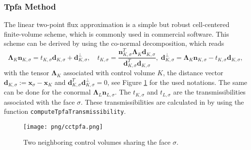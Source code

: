 \subsubsection{Tpfa Method}\label{cc_tpfa}
The linear two-point flux approximation is a simple but robust cell-centered finite-volume scheme, which is commonly used in commercial software.
This scheme can be derived by using the co-normal decomposition, which reads
\begin{equation}
\mathbf{\Lambda}_K \mathbf{n}_{K, \sigma} = t_{K,\sigma} \mathbf{d}_{K,\sigma} + \mathbf{d}^{\bot}_{K,\sigma}, \quad  t_{K,\sigma} = \frac{\mathbf{n}_{K, \sigma}^T \mathbf{\Lambda}_K \mathbf{d}_{K,\sigma} }{\mathbf{d}_{K,\sigma}^T \mathbf{d}_{K,\sigma}}, \; \mathbf{d}^{\bot}_{K,\sigma} = \mathbf{\Lambda}_K \mathbf{n}_{K, \sigma} - t_{K,\sigma} \mathbf{d}_{K,\sigma},
\label{eq:conormalDecTpfa}
\end{equation}
with the tensor $\mathbf{\Lambda}_K$ associated with control volume $K$, the distance vector $\mathbf{d}_{K,\sigma} := \mathbf{x}_\sigma - \mathbf{x}_K$ and $\mathbf{d}_{K,\sigma}^T \mathbf{d}^{\bot}_{K,\sigma} = 0$, see Figure \ref{pc:cctpfa} for the used notations. The same can be done for the conormal $\mathbf{\Lambda}_L \mathbf{n}_{L, \sigma}$. The $t_{K,\sigma}$ and $t_{L,\sigma}$ are the transmissibilities associated with the face $\sigma$. These transmissibilities are calculated in \Dumux by using the function \texttt{computeTpfaTransmissibility}.

\begin{figure} [ht]
\centering
\texttt{[image: png/cctpfa.png]}
\caption{Two neighboring control volumes sharing the face $\sigma$.}
\label{pc:cctpfa}
\end{figure}


